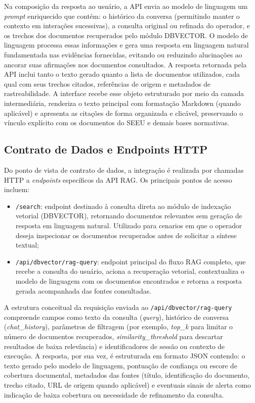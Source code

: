 Na composição da resposta ao usuário, a API envia ao modelo de linguagem um \textit{prompt} enriquecido que contém: o histórico da conversa (permitindo manter o contexto em interações sucessivas), a consulta original ou refinada do operador, e os trechos dos documentos recuperados pelo módulo DBVECTOR. O modelo de linguagem processa essas informações e gera uma resposta em linguagem natural fundamentada nas evidências fornecidas, evitando ou reduzindo alucinações ao ancorar suas afirmações nos documentos consultados. A resposta retornada pela API inclui tanto o texto gerado quanto a lista de documentos utilizados, cada qual com seus trechos citados, referências de origem e metadados de rastreabilidade. A interface recebe esse objeto estruturado por meio da camada intermediária, renderiza o texto principal com formatação Markdown (quando aplicável) e apresenta as citações de forma organizada e clicável, preservando o vínculo explícito com os documentos do SEEU e demais bases normativas.

\subsection{Contrato de Dados e Endpoints HTTP}
Do ponto de vista de contrato de dados, a integração é realizada por chamadas HTTP a \textit{endpoints} específicos da API RAG. Os principais pontos de acesso incluem:

\begin{itemize}
  \item \texttt{/search}: endpoint destinado à consulta direta ao módulo de indexação vetorial (DBVECTOR), retornando documentos relevantes sem geração de resposta em linguagem natural. Utilizado para cenarios em que o operador deseja inspecionar os documentos recuperados antes de solicitar a síntese textual;
  \item \texttt{/api/dbvector/rag-query}: endpoint principal do fluxo RAG completo, que recebe a consulta do usuário, aciona a recuperação vetorial, contextualiza o modelo de linguagem com os documentos encontrados e retorna a resposta gerada acompanhada das fontes consultadas.
\end{itemize}

A estrutura conceitual da requisição enviada ao \texttt{/api/dbvector/rag-query} compreende campos como texto da consulta (\textit{query}), histórico de conversa (\textit{chat\_history}), parâmetros de filtragem (por exemplo, \textit{top\_k} para limitar o número de documentos recuperados, \textit{similarity\_threshold} para descartar resultados de baixa relevância) e identificadores de sessão ou contexto de execução. A resposta, por sua vez, é estruturada em formato JSON contendo: o texto gerado pelo modelo de linguagem, pontuação de confiança ou escore de cobertura documental, metadados das fontes (título, identificação do documento, trecho citado, URL de origem quando aplicável) e eventuais sinais de alerta como indicação de baixa cobertura ou necessidade de refinamento da consulta.

